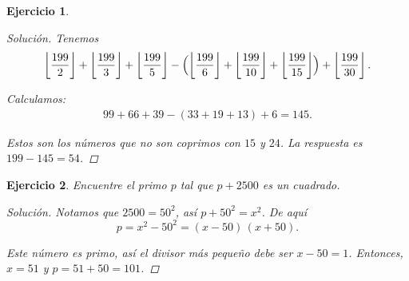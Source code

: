 \documentclass{article}
\theoremstyle{plain}
\newtheorem{ejercicio}{Ejercicio}
\newenvironment{solucion}{\begin{proof}[Solución]}{\end{proof}}
\begin{document}
\begin{ejercicio}
\begin{solucion}
    Tenemos
    \[
        \left\lfloor\frac{199}{2}\right\rfloor + \left\lfloor\frac{199}{3}\right\rfloor + \left\lfloor\frac{199}{5}\right\rfloor
        - \Bigl(\left\lfloor\frac{199}{6}\right\rfloor + \left\lfloor\frac{199}{10}\right\rfloor + \left\lfloor\frac{199}{15}\right\rfloor\Bigr)
        + \left\lfloor\frac{199}{30}\right\rfloor.
    \]

    Calculamos:
    \begin{gather*}
        99 + 66 + 39 - (33 + 19 + 13) + 6 = 145.
    \end{gather*}
    
    Estos son los números que \emph{no son} coprimos con $15$ y $24$.
    La respuesta es $199 - 145 = 54$.
\end{solucion}
\fi
\end{ejercicio}

\pagebreak

\begin{ejercicio}
Encuentre el primo $p$ tal que $p + 2500$ es un cuadrado.

\ifdefined\solutions
\begin{solucion}
    Notamos que $2500 = 50^2$, así $p + 50^2 = x^2$. De aquí
    \[ p = x^2 - 50^2 = (x - 50)\,(x + 50). \]
    
    Este número es primo, así el divisor más pequeño debe ser $x - 50 = 1$.
    Entonces, $x = 51$ y $p = 51 + 50 = 101$.
\end{solucion}
\fi
\end{ejercicio}

\pagebreak
\end{document}

